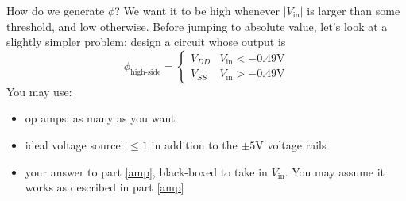 \begin{enumerate}

\qitem\label{phi_oneSide}{
	How do we generate $\phi$? We want it to be high whenever $|V_\text{in}|$ is larger than some threshold, and low otherwise. Before jumping to absolute value, let's look at a slightly simpler problem: design a circuit whose output is
	$$\phi_\text{high-side} = \begin{cases}
								V_{DD} & V_\text{in} < -0.49\si{\volt}\\
								V_{SS} & V_\text{in} > -0.49\si{\volt}
							\end{cases}$$
	You may use:
	\begin{itemize}
		\item op amps: as many as you want
		\item ideal voltage source: $\leq 1$ in addition to the $\pm 5\si{\volt}$ voltage rails
		\item your answer to part \ref{amp}, black-boxed to take in $V_\text{in}$. You may assume it works as described in part \ref{amp}
	\end{itemize}}





\end{enumerate}
